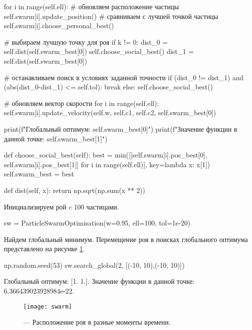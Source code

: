 \newpage
\begin{pyprint}
       for i in range(self.ell):
          # обновляем расположение частицы
          self.swarm[i].update_position()
          # сравниваем с лучшей точкой частицы
          self.swarm[i].choose_personal_best()

       # выбираем лучшую точку для роя
       if k != 0:
          dist_0 = self.dist(self.swarm_best[0])
          self.choose_social_best()
          dist_1 = self.dist(self.swarm_best[0])

          # останавливаем поиск в условиях заданной точности
          if (dist_0 != dist_1) and (abs(dist_0-dist_1) <= self.tol):
             break
       else:
          self.choose_social_best()

       # обновляем вектор скорости
       for i in range(self.ell):
          self.swarm[i].update_velocity(self.w, self.c1,
                                        self.c2, self.swarm_best[0])

    print(f"Глобальный оптимум: {self.swarm_best[0]}")
    print(f"Значение функции в данной точке: {self.swarm_best[1]}")

  def choose_social_best(self):
    best = min([[self.swarm[i].pos_best[0],
                 self.swarm[i].pos_best[1]] for i in range(self.ell)],
                 key=lambda x: x[1])
    self.swarm_best = best

  def dist(self, x):
    return np.sqrt(np.sum(x ** 2))
\end{pyprint}

Инициализируем рой c 100 частицами.
\begin{pyin}
sw = ParticleSwarmOptimisation(w=0.95, ell=100, tol=1e-20)
\end{pyin}

Найдем глобальный минимум. Перемещение роя в поисках глобального оптимума представлено на рисунке \ref{img:swarm}.
\begin{pyin}
np.random.seed(53)
sw.search_global(2, [(-10, 10),(-10, 10)])
\end{pyin}

\begin{pyout}
Глобальный оптимум: [1. 1.].
Значение функции в данной точке: 6.366439023928984e-22.
\end{pyout}

\begin{figure}[h!]
\centering
\texttt{[image: swarm]}
\caption{ --- Расположение роя в разные моменты времени.}
\label{img:swarm}
\end{figure}

